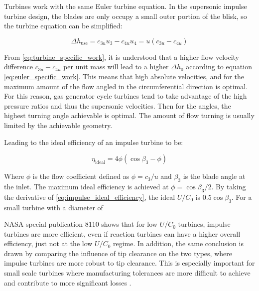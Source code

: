 
Turbines work with the same Euler turbine equation. In the supersonic impulse turbine design, the blades are only occupy a small outer portion of the blisk, so the turbine equation can be simplified:

\begin{equation}
    \Delta h_{\textrm{use}}=c_{3u}u_3-c_{4u}u_4=u(c_{3u}-c_{4u})
    \label{eq:turbine_specific_work}
\end{equation}

From \cref{eq:turbine_specific_work}, it is understood that a higher flow velocity difference $c_{3u}-c_{4u}$ per unit mass will lead to a higher $\Delta h_0$ according to equation \cref{eq:euler_specific_work}. This means that high absolute velocities, and for the maximum amount of the flow angled in the circumferential direction is optimal. For this reason, gas generator cycle turbines tend to take advantage of the high pressure ratios and thus the supersonic velocities. Then for the angles, the highest turning angle achievable is optimal. The amount of flow turning is usually limited by the achievable geometry.



Leading to the ideal efficiency of an impulse turbine to be:

\begin{equation}
    \eta_{\textrm{ideal}} = 4\phi(\cos\beta_3-\phi)
    \label{eq:impulse_ideal_efficiency}
\end{equation}

Where $\phi$ is the flow coefficient defined as $\phi=c_3/u$ and $\beta_3$ is the blade angle at the inlet. The maximum ideal efficiency is achieved at $\phi=\cos\beta_3/2$. By taking the derivative of \cref{eq:impulse_ideal_efficiency}, the ideal $U/C_0$ is $0.5\cos\beta_3$. For a small turbine with a diameter of 


NASA special publication 8110 shows that for low $U/C_0$ turbines, impulse turbines are more efficient, even if reaction turbines can have a higher overall efficiency, just not at the low $U/C_0$ regime. In addition, the same conclusion is drawn by comparing the influence of tip clearance on the two types, where impulse turbines are more robust to tip clearance. This is especially important for small scale turbines where manufacturing tolerances are more difficult to achieve and contribute to more significant losses \cite{NASASP8110}. 




